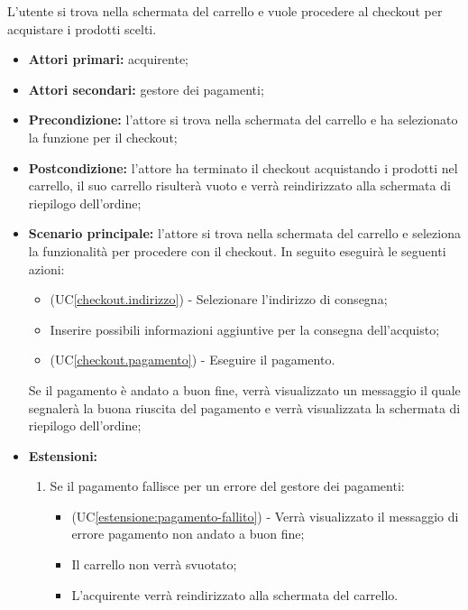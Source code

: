 L'utente si trova nella schermata del carrello e vuole procedere al checkout per acquistare i prodotti scelti.
\begin{itemize}
    \item \textbf{Attori primari:} acquirente;
    \item \textbf{Attori secondari:} gestore dei pagamenti;
    \item \textbf{Precondizione:} l'attore si trova nella schermata del carrello e ha selezionato la funzione per il checkout;
    \item \textbf{Postcondizione:} l'attore ha terminato il checkout acquistando i prodotti nel carrello, il suo carrello risulterà vuoto e verrà reindirizzato alla schermata di riepilogo dell'ordine;
    \item \textbf{Scenario principale:} l'attore si trova nella schermata del carrello e seleziona la funzionalità per procedere con il checkout. In seguito eseguirà le seguenti azioni:
    \begin{itemize}
    	\item (UC\ref{checkout.indirizzo}) - Selezionare l'indirizzo di consegna;
    	\item Inserire possibili informazioni aggiuntive per la consegna dell'acquisto;
        \item (UC\ref{checkout.pagamento}) - Eseguire il pagamento.
    \end{itemize}
    Se il pagamento è andato a buon fine, verrà visualizzato un messaggio il quale segnalerà la buona riuscita del pagamento e verrà visualizzata la schermata di riepilogo dell'ordine;
    \item \textbf{Estensioni:}
    \begin{enumerate}[label=\lett]
        \item Se il pagamento fallisce per un errore del gestore dei pagamenti:
        \begin{itemize}
            \item (UC\ref{estensione:pagamento-fallito}) - Verrà visualizzato il messaggio di errore pagamento non andato a buon fine;
            \item Il carrello non verrà svuotato;
            \item L'acquirente verrà reindirizzato alla schermata del carrello.
        \end{itemize}
    \end{enumerate}
\end{itemize}

\label{checkout.indirizzo}

